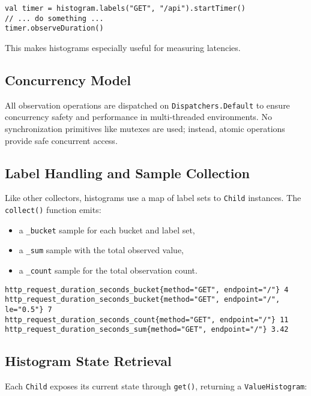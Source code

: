 \begin{verbatim}
val timer = histogram.labels("GET", "/api").startTimer()
// ... do something ...
timer.observeDuration()
\end{verbatim}

This makes histograms especially useful for measuring latencies.

\subsection{Concurrency Model}

All observation operations are dispatched on \texttt{Dispatchers.Default} to ensure concurrency safety and performance in multi-threaded environments. No synchronization primitives like mutexes are used; instead, atomic operations provide safe concurrent access.

\subsection{Label Handling and Sample Collection}

Like other collectors, histograms use a map of label sets to \texttt{Child} instances. The \texttt{collect()} function emits:

\begin{itemize}
    \item a \texttt{\_bucket} sample for each bucket and label set,
    \item a \texttt{\_sum} sample with the total observed value,
    \item a \texttt{\_count} sample for the total observation count.
\end{itemize}

\begin{verbatim}
http_request_duration_seconds_bucket{method="GET", endpoint="/"} 4
http_request_duration_seconds_bucket{method="GET", endpoint="/", le="0.5"} 7
http_request_duration_seconds_count{method="GET", endpoint="/"} 11
http_request_duration_seconds_sum{method="GET", endpoint="/"} 3.42
\end{verbatim}

\subsection{Histogram State Retrieval}

Each \texttt{Child} exposes its current state through \texttt{get()}, returning a \texttt{ValueHistogram}:

